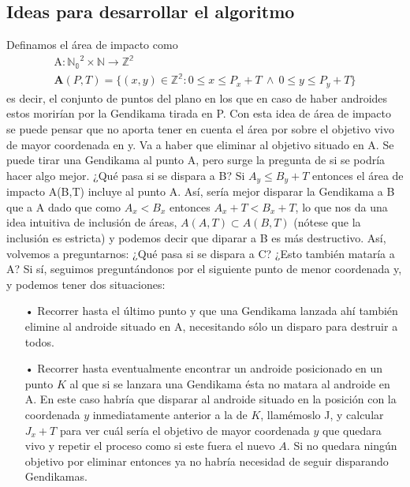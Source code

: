 \documentclass[10pt,a4paper]{article}
\begin{document}
\subsection{Ideas para desarrollar el algoritmo}

Definamos el área de impacto como
\begin{gather*}
\textrm{A}:\mathbb{N_{0}}^2 \times \mathbb{N} \rightarrow \mathbb{Z^2}\\
 \mathbf{A}(P,T) = \{ (x, y) \in \mathbb{Z^2} : 0 \leq x \leq P_{x}+T ~ \wedge ~ 0 \leq y \leq P_{y}+T \}
\end{gather*}
 es decir, el conjunto de puntos del plano en los que en caso de haber androides estos morirían por la Gendikama tirada en P. Con esta idea de área de impacto se puede pensar que no aporta tener en cuenta el área por sobre el objetivo vivo de mayor coordenada en y.
Va a haber que eliminar al objetivo situado en A. Se puede tirar una Gendikama al punto A, pero surge la pregunta de si se podría hacer algo mejor. ¿Qué pasa si se dispara a B? Si $ A_{y} \leq B_{y}+T$ entonces el área de impacto A(B,T) incluye al punto A. Así, sería mejor disparar la Gendikama a B que a A dado que como  $A_{x} < B_{x}$ entonces  $A_{x}+T < B_{x}+T$, lo que nos da una idea intuitiva de inclusión de áreas, $A(A,T) \subset A(B,T)$ (nótese que la inclusión es estricta) y podemos decir que diparar a B es más destructivo.
Así, volvemos a preguntarnos: ¿Qué pasa si se dispara a C? ¿Esto también mataría a A?
Si sí, seguimos preguntándonos por el siguiente punto de menor coordenada y, y podemos tener dos situaciones:

\begin{itemize}
\item[•] Recorrer hasta el último punto y que una Gendikama lanzada ahí también elimine al androide situado en A, necesitando sólo un disparo para destruir a todos.
\item[•] Recorrer hasta eventualmente encontrar un androide posicionado en un punto $K$ al que si se lanzara una Gendikama ésta no matara al androide en A. En este caso habría que disparar al androide situado en la posición con la coordenada $y$ inmediatamente anterior a la de $K$, llamémoslo J, y calcular $J_{x}+T$ para ver cuál sería el objetivo de mayor coordenada $y$ que quedara vivo  y repetir el proceso como si este fuera el nuevo $A$. Si no quedara ningún objetivo por eliminar entonces ya no habría necesidad de seguir disparando Gendikamas.
\end{itemize}
\\
\end{document}
